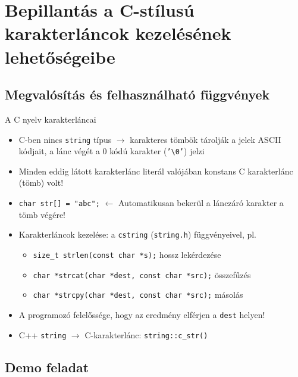 \documentclass[usenames,dvipsnames,aspectratio=169]{beamer}
\begin{document}
\section{Bepillantás a C-stílusú karakterláncok kezelésének lehetőségeibe}
\subsection{Megvalósítás és felhasználható függvények}
\begin{frame}
  A C nyelv karakterláncai
  \begin{itemize}
    \item C-ben nincs \texttt{string} típus $\to$ karakteres tömbök tárolják a jelek ASCII kódjait, a lánc végét a 0 kódú karakter (\texttt{'\textbackslash 0'}) jelzi
    \item Minden eddig látott karakterlánc literál valójában konstans C karakterlánc (tömb) volt!
    \item \texttt{char str[] = "abc";} $\leftarrow$ Automatikusan bekerül a lánczáró karakter a tömb végére!
    \item Karakterláncok kezelése: a \texttt{cstring} (\texttt{string.h}) függvényeivel, pl.
    \begin{itemize}
      \item \texttt{size\_t strlen(const char *s);} hossz lekérdezése
      \item \texttt{char *strcat(char *dest, const char *src);} összefűzés
      \item \texttt{char *strcpy(char *dest, const char *src);} másolás
    \end{itemize}
    \item A programozó felelőssége, hogy az eredmény elférjen a \texttt{dest} helyen!
    \item C++ \texttt{string} $\to$ C-karakterlánc: \texttt{string::c\_str()}
  \end{itemize}
\end{frame}

\subsection{Demo feladat}
\begin{frame}
  \begin{exampleblock}{}
    \vspace{-0.2cm}
    
    \vspace{-0.2cm}
  \end{exampleblock}
\end{frame}
\end{document}
